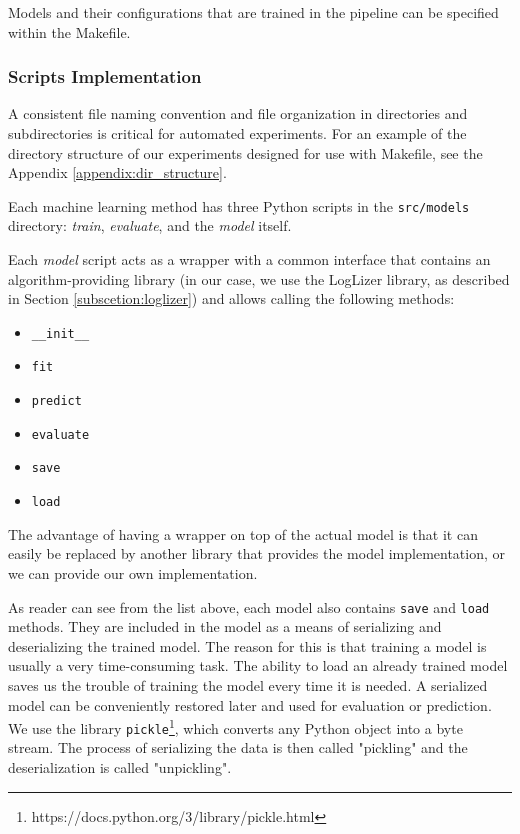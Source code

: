  \begin{figure}[!h] 
\end{figure}

Models and their configurations that are trained in the pipeline can be specified within the Makefile.

\subsubsection*{Scripts Implementation}
 A consistent file naming convention and file organization in directories and subdirectories is critical for automated experiments. For an example of the directory structure of our experiments designed for use with Makefile, see the Appendix \ref{appendix:dir_structure}.
 
 Each machine learning method has three Python scripts in the \texttt{src/models} directory: \textit{train}, \textit{evaluate}, and the \textit{model} itself. 
 
 Each \textit{model} script acts as a wrapper with a common interface that contains an algorithm-providing library (in our case, we use the LogLizer library, as described in Section \ref{subscetion:loglizer}) and allows calling the following methods:
 
\begin{itemize}
    \item \texttt{\_\_init\_\_}
    \item \texttt{fit}
    \item \texttt{predict}
    \item \texttt{evaluate}
    \item \texttt{save}
    \item \texttt{load}
\end{itemize}

The advantage of having a wrapper on top of the actual model is that it can easily be replaced by another library that provides the model implementation, or we can provide our own implementation.

As reader can see from the list above, each model also contains \texttt{save} and \texttt{load} methods. They are included in the model as a means of serializing and deserializing the trained model. The reason for this is that training a model is usually a very time-consuming task. The ability to load an already trained model saves us the trouble of training the model every time it is needed. A serialized model can be conveniently restored later and used for evaluation or prediction. We use the library \texttt{pickle}\footnote{https://docs.python.org/3/library/pickle.html}, which converts any Python object into a byte stream. The process of serializing the data is then called "pickling" and the deserialization is called "unpickling".

